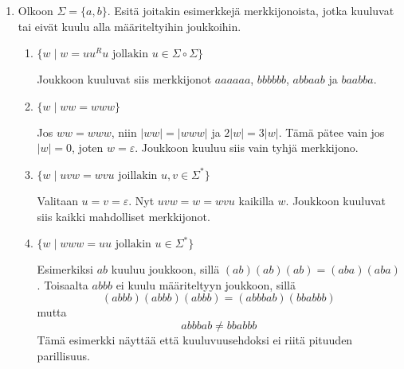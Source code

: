 \documentclass[a4paper,11pt,draft]{article}
\newtheorem*{claim}{Väite}
\begin{document}
\begin{enumerate}
\begin{enumerate}
  \item
    \begin{claim}
      Kaikilla kielillä $L$, $\emptyset \circ L = L \circ \emptyset = \emptyset$.
    \end{claim}

    \begin{proof}
      Jos $uv \in \emptyset \circ L$, niin $u \in \emptyset$. Koska
      tyhjässä joukossa ei ole yhtään alkiota, niin myös $\emptyset
      \circ L$ on tyhjä joukko. Vastaavasti tapauksella $L \circ
      \emptyset$. Siis $\emptyset \circ L = L \circ \emptyset =
      \emptyset$.
    \end{proof}
  \end{enumerate}

\item
  Olkoon $\Sigma = \{a,b\}$. Esitä joitakin esimerkkejä
  merkkijonoista, jotka kuuluvat tai eivät kuulu alla määriteltyihin
  joukkoihin.

  \begin{enumerate}
  \item
    $\{w \mid w = uu^Ru \text{ jollakin } u \in \Sigma \circ
    \Sigma\}$

    Joukkoon kuuluvat siis merkkijonot $aaaaaa$, $bbbbbb$, $abbaab$
    ja $baabba$.

  \item
    $\{w \mid ww = www\}$

    Jos $ww = www$, niin $|ww| = |www|$ ja $2|w| = 3|w|$.
    Tämä pätee vain jos $|w| = 0$, joten $w = \varepsilon$. Joukkoon
    kuuluu siis vain tyhjä merkkijono.

  \item
    $\{w \mid uvw = wvu \text{ joillakin } u,v \in \Sigma^*\}$

    Valitaan $u = v = \varepsilon$. Nyt $uvw = w = wvu$ kaikilla
    $w$. Joukkoon kuuluvat siis kaikki mahdolliset merkkijonot.

  \item
    $\{w \mid www = uu \text{ jollakin } u \in \Sigma^*\}$

    Esimerkiksi $ab$ kuuluu joukkoon, sillä $(ab)(ab)(ab) =
    (aba)(aba)$. Toisaalta $abbb$ ei kuulu määriteltyyn joukkoon,
    sillä
    \begin{equation*}
    (abbb)(abbb)(abbb) = (abbbab)(bbabbb)
    \end{equation*}
    mutta
    \begin{equation*}
      abbbab \neq bbabbb
    \end{equation*}
    Tämä esimerkki näyttää että kuuluvuusehdoksi ei riitä pituuden
    parillisuus.
  \end{enumerate}


\end{enumerate}
\end{document}
